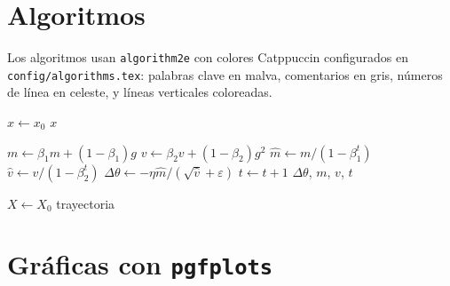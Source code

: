 \section{Algoritmos}
\label{sec:algoritmos}

Los algoritmos usan \texttt{algorithm2e} con colores Catppuccin configurados
en \texttt{config/algorithms.tex}: palabras clave en malva, comentarios en
gris, números de línea en celeste, y líneas verticales coloreadas.

\begin{algorithm}[H]
\caption{Descenso de gradiente}
\label{alg:gradient}
\LinesNumbered
{}
$x \leftarrow x_0$\;
\Return $x$\;
\end{algorithm}

\begin{algorithm}[H]
\caption{Adam (un paso)}
\label{alg:adam}
\LinesNumbered
{}
$m \leftarrow \beta_1 m + (1-\beta_1) g$\;
$v \leftarrow \beta_2 v + (1-\beta_2) g^2$\;
$\hat{m} \leftarrow m / (1-\beta_1^t)$\;
$\hat{v} \leftarrow v / (1-\beta_2^t)$\;
$\Delta\theta \leftarrow -\eta \hat{m} / (\sqrt{\hat{v}} + \varepsilon)$\;
$t \leftarrow t+1$\;
\Return $\Delta\theta$, $m$, $v$, $t$\;
\end{algorithm}

\begin{algorithm}[H]
\caption{Euler--Maruyama para SDEs}
\label{alg:em}
\LinesNumbered
{}
$X \leftarrow X_0$\;
\Return trayectoria\;
\end{algorithm}


\section{Gráficas con \texttt{pgfplots}}
\label{sec:pgfplots}

